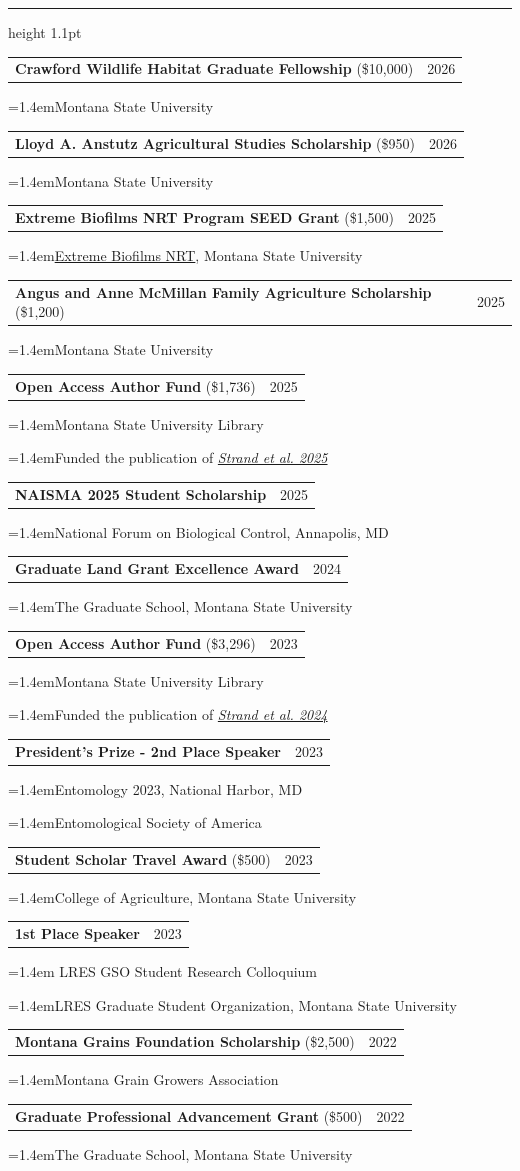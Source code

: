 \documentclass[10pt,letterpaper]{article}
\makeatletter
\newcommand{\cvsection}[1]{\par\vspace{11pt}{\large\bfseries\MakeUppercase{#1}}\par\vspace{1pt}\hrule height 1.1pt\vspace{6pt}\nopagebreak[4]}
\newcommand{\cvrow}[2]{\noindent\begin{tabularx}{\linewidth}{@{}X@{\hspace{1em}}r@{}}#1 & #2\end{tabularx}\par\vspace{-1pt}}
\newcommand{\cvdetail}[1]{{\leftskip=1.4em\noindent #1\par}}
\makeatother
\begin{document}
\cvsection{Honors \& Awards}
\cvrow{\textbf{Crawford Wildlife Habitat Graduate Fellowship} (\$10,000)}{2026}
\cvdetail{Montana State University}
\vspace{3pt}
\cvrow{\textbf{Lloyd A. Anstutz Agricultural Studies Scholarship} (\$950)}{2026}
\cvdetail{Montana State University}
\vspace{3pt}
\cvrow{\textbf{Extreme Biofilms NRT Program SEED Grant} (\$1,500)}{2025}
\cvdetail{\href{https://tbi.montana.edu/nrt-extreme-biofilms/index.html}{Extreme Biofilms NRT}, Montana State University}
\vspace{3pt}
\cvrow{\textbf{Angus and Anne McMillan Family Agriculture Scholarship} (\$1,200)}{2025}
\cvdetail{Montana State University}
\vspace{3pt}
\cvrow{\textbf{Open Access Author Fund} (\$1,736)}{2025}
\cvdetail{Montana State University Library}
\cvdetail{Funded the publication of \href{https://doi.org/10.1093/jisesa/ieaf016}{\emph{Strand et al. 2025}}}
\vspace{3pt}
\cvrow{\textbf{NAISMA 2025 Student Scholarship}}{2025}
\cvdetail{National Forum on Biological Control, Annapolis, MD}
\vspace{3pt}
\cvrow{\textbf{Graduate Land Grant Excellence Award}}{2024}
\cvdetail{The Graduate School, Montana State University}
\vspace{3pt}
\cvrow{\textbf{Open Access Author Fund} (\$3,296)}{2023}
\cvdetail{Montana State University Library}
\cvdetail{Funded the publication of \href{https://doi.org/10.1093/jee/toae246}{\emph{Strand et al. 2024}}}
\vspace{3pt}
\cvrow{\textbf{President’s Prize - 2nd Place Speaker}}{2023}
\cvdetail{Entomology 2023, National Harbor, MD}
\cvdetail{Entomological Society of America}
\vspace{3pt}
\cvrow{\textbf{Student Scholar Travel Award} (\$500)}{2023}
\cvdetail{College of Agriculture, Montana State University}
\vspace{3pt}
\cvrow{\textbf{1st Place Speaker}}{2023}
\cvdetail{2023 LRES GSO Student Research Colloquium}
\cvdetail{LRES Graduate Student Organization, Montana State University}
\vspace{3pt}
\cvrow{\textbf{Montana Grains Foundation Scholarship} (\$2,500)}{2022}
\cvdetail{Montana Grain Growers Association}
\vspace{3pt}
\cvrow{\textbf{Graduate Professional Advancement Grant} (\$500)}{2022}
\cvdetail{The Graduate School, Montana State University}
\vspace{3pt}
\end{document}
